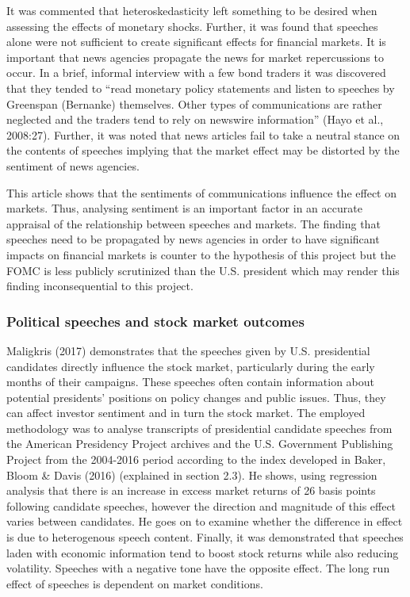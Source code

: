 \documentclass[11pt,preprint, authoryear]{elsarticle}
\numberwithin{equation}{section}
\numberwithin{figure}{section}
\numberwithin{table}{section}
\begin{document}
It was commented that heteroskedasticity left something to be desired
when assessing the effects of monetary shocks. Further, it was found
that speeches alone were not sufficient to create significant effects
for financial markets. It is important that news agencies propagate the
news for market repercussions to occur. In a brief, informal interview
with a few bond traders it was discovered that they tended to ``read
monetary policy statements and listen to speeches by Greenspan
(Bernanke) themselves. Other types of communications are rather
neglected and the traders tend to rely on newswire information'' (Hayo
et al., 2008:27). Further, it was noted that news articles fail to take
a neutral stance on the contents of speeches implying that the market
effect may be distorted by the sentiment of news agencies.

This article shows that the sentiments of communications influence the
effect on markets. Thus, analysing sentiment is an important factor in
an accurate appraisal of the relationship between speeches and markets.
The finding that speeches need to be propagated by news agencies in
order to have significant impacts on financial markets is counter to the
hypothesis of this project but the FOMC is less publicly scrutinized
than the U.S. president which may render this finding inconsequential to
this project.

\hypertarget{political-speeches-and-stock-market-outcomes}{%
\subsubsection{Political speeches and stock market
outcomes}\label{political-speeches-and-stock-market-outcomes}}

Maligkris (2017) demonstrates that the speeches given by U.S.
presidential candidates directly influence the stock market,
particularly during the early months of their campaigns. These speeches
often contain information about potential presidents' positions on
policy changes and public issues. Thus, they can affect investor
sentiment and in turn the stock market. The employed methodology was to
analyse transcripts of presidential candidate speeches from the American
Presidency Project archives and the U.S. Government Publishing Project
from the 2004-2016 period according to the index developed in Baker,
Bloom \& Davis (2016) (explained in section 2.3). He shows, using
regression analysis that there is an increase in excess market returns
of 26 basis points following candidate speeches, however the direction
and magnitude of this effect varies between candidates. He goes on to
examine whether the difference in effect is due to heterogenous speech
content. Finally, it was demonstrated that speeches laden with economic
information tend to boost stock returns while also reducing volatility.
Speeches with a negative tone have the opposite effect. The long run
effect of speeches is dependent on market conditions.
\end{document}
